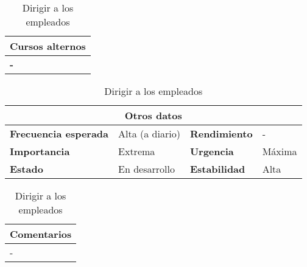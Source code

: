 \begin{table}[H]
\vspace{1cm}

\begin{tabular}{|m{10pt}|m{7.15cm}|m{10pt}|m{7.15cm}|}
\hline
\multicolumn{4}{|m{16.2cm}|}{\textbf{Cursos alternos}} \\
\hline
\multicolumn{4}{|m{16.2cm}|}{\textbf{-}} \\
\hline
\end{tabular}

\vspace{1cm}

\begin{tabular}{|m{3.72cm}|m{3.72cm}|m{3.72cm}|m{3.72cm}|}
\hline
\multicolumn{4}{|c|}{\textbf{Otros datos}} \\
\hline
\textbf{Frecuencia esperada} & Alta (a diario) & \textbf{Rendimiento} & - \\
\hline
\textbf{Importancia} & Extrema & \textbf{Urgencia} & Máxima \\
\hline
\textbf{Estado} & En desarrollo & \textbf{Estabilidad} & Alta \\
\hline
\end{tabular}

\vspace{1cm}

\begin{tabular}{|m{16.2cm}|}
\hline
\textbf{Comentarios} \\
\hline
- \\
\hline
\end{tabular}

\caption{Dirigir a los empleados}

\end{table}